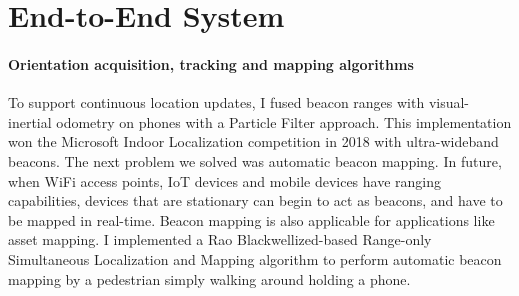 \documentclass[10pt]{article}
\begin{document}
\section{End-to-End System}

\paragraph{Orientation acquisition, tracking and mapping algorithms}


To support continuous location updates, I fused beacon ranges with visual-inertial odometry on phones with a Particle Filter approach. This implementation won the Microsoft Indoor Localization competition in 2018 with ultra-wideband beacons. The next problem we solved was automatic beacon mapping. In future, when WiFi access points, IoT devices and mobile devices have ranging capabilities, devices that are stationary can begin to act as beacons, and have to be mapped in real-time. Beacon mapping is also applicable for applications like asset mapping. I implemented a Rao Blackwellized-based Range-only Simultaneous Localization and Mapping algorithm to perform automatic beacon mapping by a pedestrian simply walking around holding a phone. 



\end{document}
